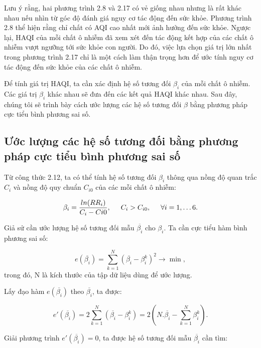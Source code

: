\documentclass[14pt]{extreport}
\theoremstyle{definition}
\theoremstyle{plain}
\theoremstyle{remark}
\begin{document}
Lưu ý rằng, hai phương trình 2.8 và 2.17 có vẻ giống nhau nhưng là rất khác nhau nếu nhìn từ góc độ đánh giá nguy cơ tác động đến sức khỏe. Phương trình 2.8 thể hiện rằng chỉ chất có AQI cao nhất mới ảnh hưởng đến sức khỏe. Ngược lại, HAQI của mỗi chất ô nhiễm đã xem xét đến tác động kết hợp của các chất ô nhiễm vượt ngưỡng tới sức khỏe con người. Do đó, việc lựa chọn giá trị lớn nhất trong phương trình 2.17 chỉ là một cách làm thận trọng hơn để ước tính nguy cơ tác động đến sức khỏe của các chất ô nhiễm.

Để tính giá trị HAQI, ta cần xác định hệ số tương đối $\beta_i$ của mỗi chất ô nhiễm. Các giá trị $\beta_i$ khác nhau sẽ đưa đến các kết quả HAQI khác nhau. Sau đây, chúng tôi sẽ trình bày cách ước lượng các hệ số tương đối $\beta$ bằng phương pháp cực tiểu bình phương sai số.

\subsection{Ước lượng các hệ số tương đối bằng phương pháp cực tiểu bình phương sai số }
Từ công thức 2.12, ta có thể tính hệ số tương đối $\beta_i$ thông qua nồng độ quan trắc $C_i$ và nồng độ quy chuẩn $C_{i0}$ của các mỗi chất ô nhiễm:

\begin{equation}
\beta_i = \dfrac{ln(RR_i)}{C_i - C{i0}}, \hspace{0.5cm} C_i > C_{i0}, \hspace{0.5cm} \forall i = 1, \ldots 6.
\end{equation}

Giả sử cần ước lượng hệ số tương đối mẫu $\overline{\beta_i}$ cho $\beta_i$. Ta cần cực tiểu hàm bình phương sai số:

\begin{equation}
e(\overline{\beta_i}) = \sum_{k=1}^N \left(\overline{\beta_i} - \beta_i^k  \right)^2   \rightarrow \min,
\end{equation}
trong đó, N là kích thước của tập dữ liệu dùng để ước lượng.

Lấy đạo hàm $e(\overline{\beta_i})$ theo $\overline{\beta_i}$, ta được:

\begin{equation}
e'(\overline{\beta_i}) = 2\sum_{k=1}^N \left(\overline{\beta_i} - \beta_i^k  \right) = 2\left(N.\overline{\beta_i} - \sum_{k=1}^N \beta_i^k \right).
\end{equation}

Giải phương trình $e'(\overline{\beta_i}) = 0$, ta được hệ số tương đối mẫu $\overline{\beta_i}$ cần tìm:
\end{document}
